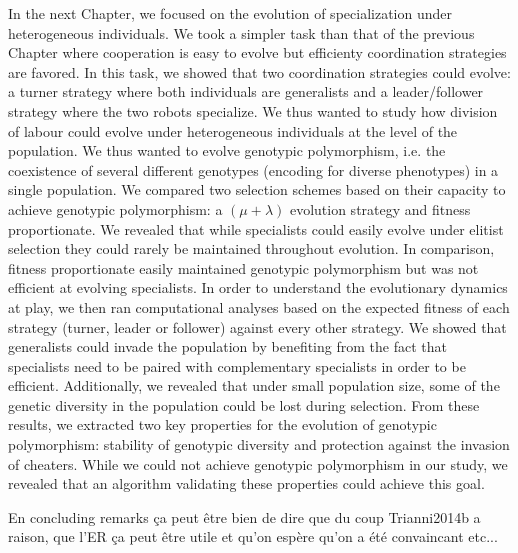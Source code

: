 		In the next Chapter, we focused on the evolution of specialization under heterogeneous individuals. We took a simpler task than that of the previous Chapter where cooperation is easy to evolve but efficienty coordination strategies are favored. In this task, we showed that two coordination strategies could evolve: a turner strategy where both individuals are generalists and a leader/follower strategy where the two robots specialize. We thus wanted to study how division of labour could evolve under heterogeneous individuals at the level of the population. We thus wanted to evolve genotypic polymorphism, i.e. the coexistence of several different genotypes (encoding for diverse phenotypes) in a single population. We compared two selection schemes based on their capacity to achieve genotypic polymorphism: a \((\mu + \lambda)\) evolution strategy and fitness proportionate. We revealed that while specialists could easily evolve under elitist selection they could rarely be maintained throughout evolution. In comparison, fitness proportionate easily maintained genotypic polymorphism but was not efficient at evolving specialists. In order to understand the evolutionary dynamics at play, we then ran computational analyses based on the expected fitness of each strategy (turner, leader or follower) against every other strategy. We showed that generalists could invade the population by benefiting from the fact that specialists need to be paired with complementary specialists in order to be efficient. Additionally, we revealed that under small population size, some of the genetic diversity in the population could be lost during selection. From these results, we extracted two key properties for the evolution of genotypic polymorphism: stability of genotypic diversity and protection against the invasion of cheaters. While we could not achieve genotypic polymorphism in our study, we revealed that an algorithm validating these properties could achieve this goal.



	En concluding remarks ça peut être bien de dire que du coup Trianni2014b a raison, que l'ER ça peut être utile et qu'on espère qu'on a été convaincant etc...